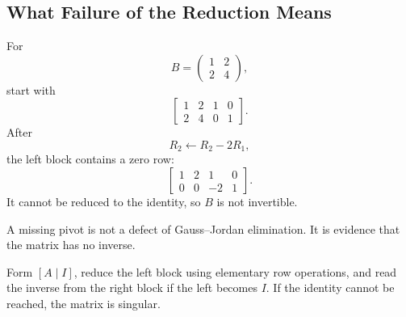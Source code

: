 \subsection{What Failure of the Reduction Means}

\begin{examplebox}
For
\[
B=\begin{pmatrix}1&2\\2&4\end{pmatrix},
\]
start with
\[
\left[\begin{array}{cc|cc}
1&2&1&0\\2&4&0&1
\end{array}\right].
\]
After
\[
R_2\leftarrow R_2-2R_1,
\]
the left block contains a zero row:
\[
\left[\begin{array}{cc|cc}
1&2&1&0\\0&0&-2&1
\end{array}\right].
\]
It cannot be reduced to the identity, so $B$ is not invertible.
\end{examplebox}

\begin{interpretationbox}
A missing pivot is not a defect of Gauss--Jordan elimination. It is evidence that the matrix has no inverse.
\end{interpretationbox}

\begin{summarybox}
Form $[A\mid I]$, reduce the left block using elementary row operations, and read the inverse from the right block if the left becomes $I$. If the identity cannot be reached, the matrix is singular.
\end{summarybox}
